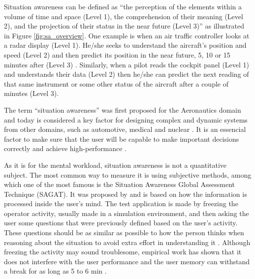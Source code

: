 Situation awareness can be defined as “the perception of the elements within a volume of time and space (Level 1), the comprehension of their meaning (Level 2), and the projection of their status in the near future (Level 3)” as illustrated in Figure \ref{fig:sa_overview}. One example is when an air traffic controller looks at a radar display (Level 1). He/she seeks to understand the aircraft's position and speed (Level 2) and then predict its position in the near future, 5, 10 or 15 minutes after (Level 3) \cite{sanders1998human}. Similarly, when a pilot reads the cockpit panel (Level 1) and understands their data (Level 2) then he/she can predict the next reading of that same instrument or some other status of the aircraft after a couple of minutes (Level 3).

The term “situation awareness” was first proposed for the Aeronautics domain and today is considered a key factor for designing complex and dynamic systems from other domains, such as automotive, medical and nuclear \cite{endsley1995measurement}. It is an essencial factor to make sure that the user will be capable to make important decisions correctly and achieve high-performance \cite{endsley1988design, endsley2018automation}.



As it is for the mental workload, situation awareness is not a quantitative subject. The most common way to measure it is using subjective methods, among which one of the most famous is the Situation Awareness Global Assessment Technique (SAGAT). It was proposed by \cite{endsley1988design} and is based on how the information is processed inside the user’s mind. The test application is made by freezing the operator activity, usually made in a simulation environment, and then asking the user some questions that were previously defined based on the user's activity. These questions should be as similar as possible to how the person thinks when reasoning about the situation to avoid extra effort in understanding it \cite{stanton2004handbook}.  Although freezing the activity may sound troublesome, empirical work has shown that it does not interfere with the user performance and the user memory can withstand a break for as long as 5 to 6 min \cite{endsley1988design}.
